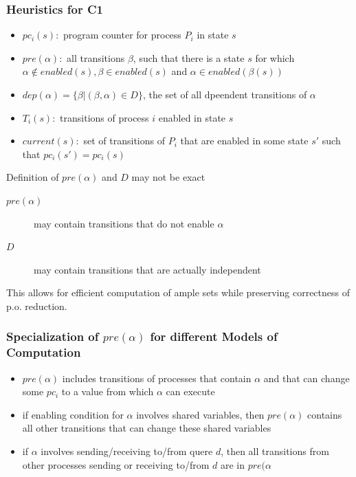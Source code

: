 \documentclass[a4paper, 10pt]{article}
\begin{document}
\subsubsection*{Heuristics for C1}
\begin{itemize}
    \item $pc_i(s):$ program counter for process $P_i$ in state $s$
    \item $pre(\alpha):$ all transitions $\beta$, such that there is a state $s$ for which $\alpha\not\in enabled(s),\beta\in enabled(s)$ and $\alpha\in enabled(\beta(s))$
    \item $dep(\alpha)=\{\beta|(\beta,\alpha)\in D\}$, the set of all dpeendent transitions of $\alpha$
    \item $T_i(s):$ transitions of process $i$ enabled in state $s$
    \item $current(s):$ set of transitions of $P_i$ that are enabled in some state $s'$ such that $pc_i(s')=pc_i(s)$
\end{itemize}
Definition of $pre(\alpha)$ and $D$ may not be exact
\begin{description}
    \item[$pre(\alpha)$] may contain transitions that do not enable $\alpha$
    \item[$D$] may contain transitions that are actually independent
\end{description}
This allows for efficient computation of ample sets while preserving correctness of p.o. reduction.
\subsubsection*{Specialization of $pre(\alpha)$ for different Models of Computation}
\begin{itemize}
    \item $pre(\alpha)$ includes transitions of processes that contain $\alpha$ and that can change some $pc_i$ to a value from which $\alpha$ can execute
    \item if enabling condition for $\alpha$ involves shared variables, then $pre(\alpha)$ contains all other transitions that can change these shared variables
    \item if $\alpha$ involves sending/receiving to/from quere $d$, then all transitions from other processes sending or receiving to/from $d$ are in $pre(\alpha$
\end{itemize}
\end{document}
